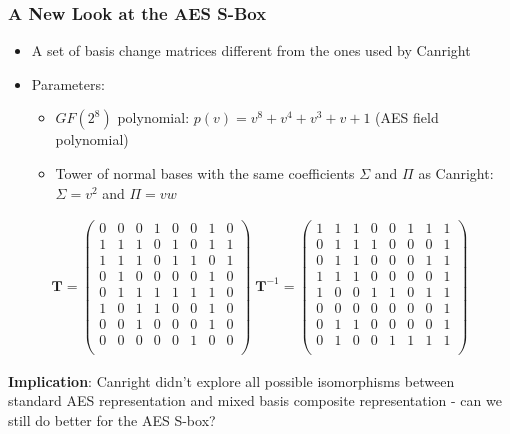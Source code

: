 \documentclass[handout,10pt]{beamer}
\begin{document}
\begin{frame}
	\frametitle{A New Look at the AES S-Box}
	\begin{itemize}
		\item A set of basis change matrices different from the ones used by Canright
		\item Parameters:
		\begin{itemize}
			\item $GF(2^8)$ polynomial: $p(v) = v^8 + v^4 + v^3 + v + 1$ (AES field polynomial)
			\item Tower of normal bases with the same coefficients $\Sigma$ and $\Pi$ as Canright: $\Sigma = v^2$ and $\Pi = vw$
		\end{itemize}
	\end{itemize}
\begin{align*}
\mathbf{T} = 
\begin{pmatrix}
0 & 0 & 0 & 1 & 0 & 0 & 1 & 0 \\
1 & 1 & 1 & 0 & 1 & 0 & 1 & 1 \\
1 & 1 & 1 & 0 & 1 & 1 & 0 & 1 \\
0 & 1 & 0 & 0 & 0 & 0 & 1 & 0 \\
0 & 1 & 1 & 1 & 1 & 1 & 1 & 0 \\
1 & 0 & 1 & 1 & 0 & 0 & 1 & 0 \\
0 & 0 & 1 & 0 & 0 & 0 & 1 & 0 \\
0 & 0 & 0 & 0 & 0 & 1 & 0 & 0 \\
\end{pmatrix}
\;
\mathbf{T}^{-1} = 
\begin{pmatrix}
1 & 1 & 1 & 0 & 0 & 1 & 1 & 1 \\
0 & 1 & 1 & 1 & 0 & 0 & 0 & 1 \\
0 & 1 & 1 & 0 & 0 & 0 & 1 & 1 \\
1 & 1 & 1 & 0 & 0 & 0 & 0 & 1 \\
1 & 0 & 0 & 1 & 1 & 0 & 1 & 1 \\
0 & 0 & 0 & 0 & 0 & 0 & 0 & 1 \\
0 & 1 & 1 & 0 & 0 & 0 & 0 & 1 \\
0 & 1 & 0 & 0 & 1 & 1 & 1 & 1 \\
\end{pmatrix}
\end{align*}

	\begin{center}
		\textbf{Implication}: Canright didn't explore all possible isomorphisms between standard AES representation and mixed basis composite representation - can we still do better for the AES S-box?
	\end{center}

\end{frame}
\end{document}
